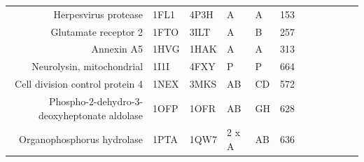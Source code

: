 \begin{table}
\begin{scriptsize}
\begin{tabular}{rrrrrrrrrrrr}
\multicolumn{1}{r}{Herpesvirus protease} & \multicolumn{1}{l}{1FL1} & \multicolumn{1}{l}{4P3H} & \multicolumn{1}{l}{A} & \multicolumn{1}{l}{A} & 153   & \cellcolor[rgb]{ 1,  .494,  .475}  & \cellcolor[rgb]{ .573,  .816,  .314}  & \cellcolor[rgb]{ 1,  .494,  .475}  & \cellcolor[rgb]{ .573,  .816,  .314}  & \cellcolor[rgb]{ .573,  .816,  .314}  & \cellcolor[rgb]{ .573,  .816,  .314}  \\
\multicolumn{1}{r}{Glutamate receptor 2} & \multicolumn{1}{l}{1FTO} & \multicolumn{1}{l}{3ILT} & \multicolumn{1}{l}{A} & \multicolumn{1}{l}{B} & 257   & \cellcolor[rgb]{ 1,  .494,  .475}  & \cellcolor[rgb]{ 1,  .494,  .475}  & \cellcolor[rgb]{ .573,  .816,  .314}  & \cellcolor[rgb]{ 1,  .494,  .475}  & \cellcolor[rgb]{ 1,  .494,  .475}  & \cellcolor[rgb]{ 1,  .494,  .475}  \\
\multicolumn{1}{r}{Annexin A5} & \multicolumn{1}{l}{1HVG} & \multicolumn{1}{l}{1HAK} & \multicolumn{1}{l}{A} & \multicolumn{1}{l}{A} & 313   & \cellcolor[rgb]{ 1,  .494,  .475}  & \cellcolor[rgb]{ 1,  .494,  .475}  & \cellcolor[rgb]{ 1,  .494,  .475}  & \cellcolor[rgb]{ .573,  .816,  .314}  & \cellcolor[rgb]{ .573,  .816,  .314}  & \cellcolor[rgb]{ 1,  .494,  .475}  \\
\multicolumn{1}{r}{Neurolysin, mitochondrial} & \multicolumn{1}{l}{1I1I} & \multicolumn{1}{l}{4FXY} & \multicolumn{1}{l}{P} & \multicolumn{1}{l}{P} & 664   & \cellcolor[rgb]{ 1,  .494,  .475}  & \cellcolor[rgb]{ 1,  .494,  .475}  & \cellcolor[rgb]{ 1,  .494,  .475}  & \cellcolor[rgb]{ 1,  .494,  .475}  & \cellcolor[rgb]{ 1,  .494,  .475}  & \cellcolor[rgb]{ .573,  .816,  .314}  \\
\multicolumn{1}{r}{Cell division control protein 4} & \multicolumn{1}{l}{1NEX} & \multicolumn{1}{l}{3MKS} & \multicolumn{1}{l}{AB} & \multicolumn{1}{l}{CD} & 572   & \cellcolor[rgb]{ .573,  .816,  .314}  & \cellcolor[rgb]{ 1,  .494,  .475}  & \cellcolor[rgb]{ 1,  .494,  .475}  & \cellcolor[rgb]{ .573,  .816,  .314}  & \cellcolor[rgb]{ 1,  .494,  .475}  & \cellcolor[rgb]{ .573,  .816,  .314}  \\
\multicolumn{1}{r}{Phospho-2-dehydro-3-deoxyheptonate aldolase} & \multicolumn{1}{l}{1OFP} & \multicolumn{1}{l}{1OFR} & \multicolumn{1}{l}{AB} & \multicolumn{1}{l}{GH} & 628   & \cellcolor[rgb]{ 1,  .494,  .475}  & \cellcolor[rgb]{ 1,  .494,  .475}  & \cellcolor[rgb]{ 1,  .494,  .475}  & \cellcolor[rgb]{ .573,  .816,  .314}  & \cellcolor[rgb]{ 1,  .494,  .475}  & \cellcolor[rgb]{ .573,  .816,  .314}  \\
\multicolumn{1}{r}{Organophosphorus hydrolase} & \multicolumn{1}{l}{1PTA} & \multicolumn{1}{l}{1QW7} & \multicolumn{1}{l}{2 x A} & \multicolumn{1}{l}{AB} & 636   & \cellcolor[rgb]{ 1,  .494,  .475}  & \cellcolor[rgb]{ 1,  .494,  .475}  & \cellcolor[rgb]{ 1,  .494,  .475}  & \cellcolor[rgb]{ 1,  .494,  .475}  & \cellcolor[rgb]{ 1,  .494,  .475}  & \cellcolor[rgb]{ 1,  .494,  .475}  \\

\end{tabular}
\end{scriptsize}
\end{table}
